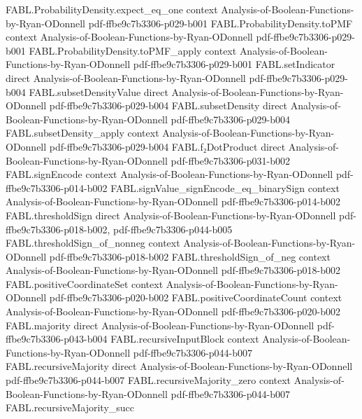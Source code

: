\begin{theorem}
\proofstep
  {FABL.ProbabilityDensity.expect_eq_one}
  {context}
  {Analysis-of-Boolean-Functions-by-Ryan-ODonnell}
  {pdf-ffbe9c7b3306-p029-b001}
\proofstep
  {FABL.ProbabilityDensity.toPMF}
  {context}
  {Analysis-of-Boolean-Functions-by-Ryan-ODonnell}
  {pdf-ffbe9c7b3306-p029-b001}
\proofstep
  {FABL.ProbabilityDensity.toPMF_apply}
  {context}
  {Analysis-of-Boolean-Functions-by-Ryan-ODonnell}
  {pdf-ffbe9c7b3306-p029-b001}
\proofstep
  {FABL.setIndicator}
  {direct}
  {Analysis-of-Boolean-Functions-by-Ryan-ODonnell}
  {pdf-ffbe9c7b3306-p029-b004}
\proofstep
  {FABL.subsetDensityValue}
  {direct}
  {Analysis-of-Boolean-Functions-by-Ryan-ODonnell}
  {pdf-ffbe9c7b3306-p029-b004}
\proofstep
  {FABL.subsetDensity}
  {direct}
  {Analysis-of-Boolean-Functions-by-Ryan-ODonnell}
  {pdf-ffbe9c7b3306-p029-b004}
\proofstep
  {FABL.subsetDensity_apply}
  {context}
  {Analysis-of-Boolean-Functions-by-Ryan-ODonnell}
  {pdf-ffbe9c7b3306-p029-b004}
\proofstep
  {FABL.f₂DotProduct}
  {direct}
  {Analysis-of-Boolean-Functions-by-Ryan-ODonnell}
  {pdf-ffbe9c7b3306-p031-b002}
\proofstep
  {FABL.signEncode}
  {context}
  {Analysis-of-Boolean-Functions-by-Ryan-ODonnell}
  {pdf-ffbe9c7b3306-p014-b002}
\proofstep
  {FABL.signValue_signEncode_eq_binarySign}
  {context}
  {Analysis-of-Boolean-Functions-by-Ryan-ODonnell}
  {pdf-ffbe9c7b3306-p014-b002}
\proofstep
  {FABL.thresholdSign}
  {direct}
  {Analysis-of-Boolean-Functions-by-Ryan-ODonnell}
  {pdf-ffbe9c7b3306-p018-b002,
    pdf-ffbe9c7b3306-p044-b005}
\proofstep
  {FABL.thresholdSign_of_nonneg}
  {context}
  {Analysis-of-Boolean-Functions-by-Ryan-ODonnell}
  {pdf-ffbe9c7b3306-p018-b002}
\proofstep
  {FABL.thresholdSign_of_neg}
  {context}
  {Analysis-of-Boolean-Functions-by-Ryan-ODonnell}
  {pdf-ffbe9c7b3306-p018-b002}
\proofstep
  {FABL.positiveCoordinateSet}
  {context}
  {Analysis-of-Boolean-Functions-by-Ryan-ODonnell}
  {pdf-ffbe9c7b3306-p020-b002}
\proofstep
  {FABL.positiveCoordinateCount}
  {context}
  {Analysis-of-Boolean-Functions-by-Ryan-ODonnell}
  {pdf-ffbe9c7b3306-p020-b002}
\proofstep
  {FABL.majority}
  {direct}
  {Analysis-of-Boolean-Functions-by-Ryan-ODonnell}
  {pdf-ffbe9c7b3306-p043-b004}
\proofstep
  {FABL.recursiveInputBlock}
  {context}
  {Analysis-of-Boolean-Functions-by-Ryan-ODonnell}
  {pdf-ffbe9c7b3306-p044-b007}
\proofstep
  {FABL.recursiveMajority}
  {direct}
  {Analysis-of-Boolean-Functions-by-Ryan-ODonnell}
  {pdf-ffbe9c7b3306-p044-b007}
\proofstep
  {FABL.recursiveMajority_zero}
  {context}
  {Analysis-of-Boolean-Functions-by-Ryan-ODonnell}
  {pdf-ffbe9c7b3306-p044-b007}
\proofstep
  {FABL.recursiveMajority_succ}

\end{theorem}
